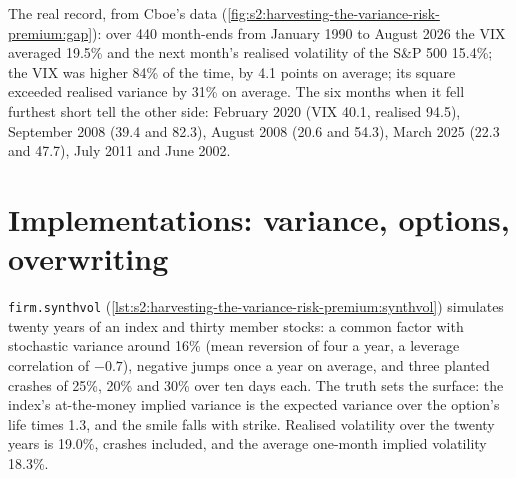 The real record, from Cboe's data (\cref{fig:s2:harvesting-the-variance-risk-premium:gap}): over 440 month-ends from January 1990 to August 2026 the VIX
averaged 19.5\% and the next month's realised volatility of the S\&P 500 15.4\%; the VIX was higher 84\% of the time, by 4.1 points on average; its
square exceeded realised variance by 31\% on average. The six months when it fell furthest short tell the other side: February 2020 (VIX 40.1, realised
94.5), September 2008 (39.4 and 82.3), August 2008 (20.6 and 54.3), March 2025 (22.3 and 47.7), July 2011 and June 2002.

\begin{omfigure}

\label{fig:s2:harvesting-the-variance-risk-premium:gap}
\end{omfigure}

\section{Implementations: variance, options, overwriting}

\texttt{firm.synthvol} (\cref{lst:s2:harvesting-the-variance-risk-premium:synthvol}) simulates twenty years of an index and thirty member stocks: a common
factor with stochastic variance around 16\% (mean reversion of four a year, a leverage correlation of $-0.7$), negative jumps once a year on average, and
three planted crashes of 25\%, 20\% and 30\% over ten days each. The truth sets the surface: the index's at-the-money implied variance is the expected
variance over the option's life times 1.3, and the smile falls with strike. Realised volatility over the twenty years is 19.0\%, crashes included, and
the average one-month implied volatility 18.3\%.

